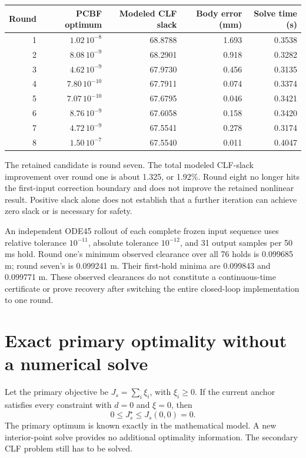 \documentclass[11pt]{article}
\begin{document}
\begin{center}\small\begin{tabular}{rrrrr}\toprule
Round & PCBF optimum & Modeled CLF slack & Body error (mm) & Solve time (s)\\\midrule
1 & $1.02\,10^{-8}$ & 68.8788 & 1.693 & 0.3538\\
2 & $8.08\,10^{-9}$ & 68.2901 & 0.918 & 0.3282\\
3 & $4.62\,10^{-9}$ & 67.9730 & 0.456 & 0.3135\\
4 & $7.80\,10^{-10}$ & 67.7911 & 0.074 & 0.3374\\
5 & $7.07\,10^{-10}$ & 67.6795 & 0.046 & 0.3421\\
6 & $8.76\,10^{-9}$ & 67.6058 & 0.158 & 0.3420\\
7 & $4.72\,10^{-9}$ & 67.5541 & 0.278 & 0.3174\\
8 & $1.50\,10^{-7}$ & 67.5540 & 0.011 & 0.4047\\\bottomrule\end{tabular}\end{center}
The retained candidate is round seven. The total modeled CLF-slack
improvement over round one is about 1.325, or 1.92\%. Round eight no longer
hits the first-input correction boundary and does not improve the retained
nonlinear result. Positive slack alone does not establish that a further
iteration can achieve zero slack or is necessary for safety.

An independent ODE45 rollout of each complete frozen input sequence uses
relative tolerance $10^{-11}$, absolute tolerance $10^{-12}$, and 31 output
samples per 50 ms hold. Round one's minimum observed clearance over all
76 holds is 0.099685 m; round seven's is 0.099241 m. Their first-hold minima
are 0.099843 and 0.099771 m. These observed clearances do not constitute a
continuous-time certificate or prove recovery after switching the entire
closed-loop implementation to one round.

\section{Exact primary optimality without a numerical solve}
Let the primary objective be $J_s=\sum_i\xi_i$, with $\xi_i\ge0$. If the current
anchor satisfies every constraint with $d=0$ and $\xi=0$, then
\[
 0\le J_s^\star\le J_s(0,0)=0.
\]
The primary optimum is known exactly in the mathematical model. A new
interior-point solve provides no additional optimality information. The
secondary CLF problem still has to be solved.
\end{document}
